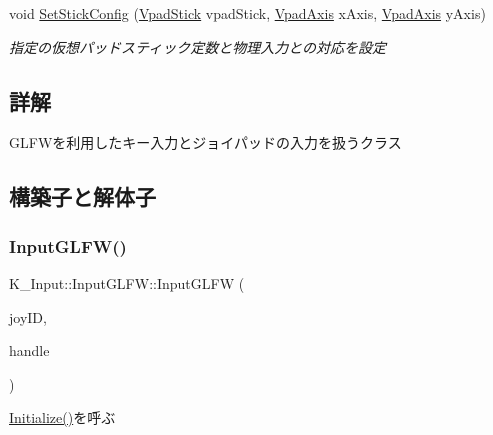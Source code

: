 \begin{DoxyCompactItemize}
void \mbox{\hyperlink{class_k___input_1_1_input_g_l_f_w_a16d6ed6b11b759930d02655d208bdd3b}{Set\+Stick\+Config}} (\mbox{\hyperlink{namespace_k___input_a18bb7eb174cac2fd54b7a5b0d02a0116}{Vpad\+Stick}} vpad\+Stick, \mbox{\hyperlink{namespace_k___input_ae7980bb169b8a865a5e67d6fe06fb729}{Vpad\+Axis}} x\+Axis, \mbox{\hyperlink{namespace_k___input_ae7980bb169b8a865a5e67d6fe06fb729}{Vpad\+Axis}} y\+Axis)
\begin{DoxyCompactList}\small\item\em 指定の仮想パッドスティック定数と物理入力との対応を設定 \end{DoxyCompactList}\end{DoxyCompactItemize}


\subsection{詳解}
G\+L\+F\+Wを利用したキー入力とジョイパッドの入力を扱うクラス 

\subsection{構築子と解体子}
\mbox{\label{class_k___input_1_1_input_g_l_f_w_a733179261d9b94d99ca3a0a60c93437c}} 
\subsubsection{\texorpdfstring{Input\+G\+L\+F\+W()}{InputGLFW()}}
{\footnotesize\ttfamily K\+\_\+\+Input\+::\+Input\+G\+L\+F\+W\+::\+Input\+G\+L\+FW (\begin{DoxyParamCaption}\item[{unsigned int}]{joy\+ID,  }\item[{G\+L\+F\+Wwindow $\ast$}]{handle }\end{DoxyParamCaption})}



\mbox{\hyperlink{class_k___input_1_1_input_g_l_f_w_adebfa33e196d75a37714a452622cf90e}{Initialize()}}を呼ぶ 

\mbox{\label{class_k___input_1_1_input_g_l_f_w_a5125b026d330c14dccdb0399e7b6d38d}} 
